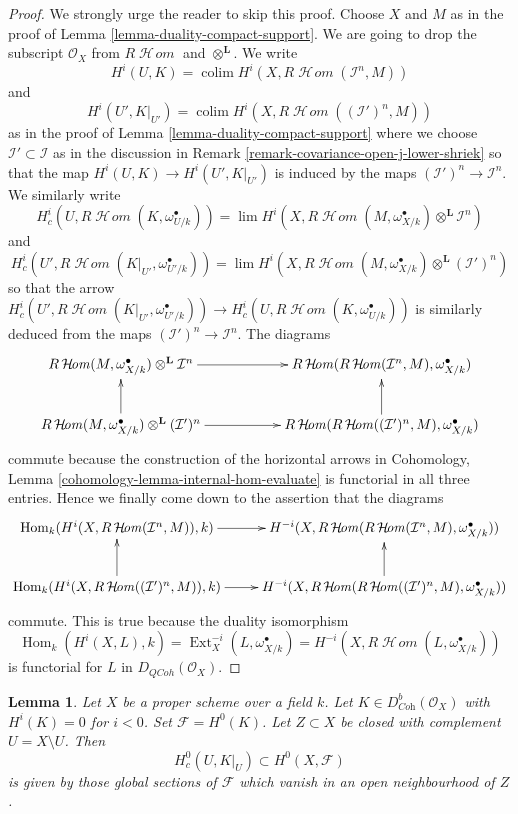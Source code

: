 \documentclass{stacks-project}
\theoremstyle{plain}
\newtheorem{lemma}[subsection]{Lemma}
\theoremstyle{definition}
\theoremstyle{remark}
\numberwithin{equation}{subsection}
\def\lim{\mathop{\mathrm{lim}}\nolimits}
\def\colim{\mathop{\mathrm{colim}}\nolimits}
\def\Hom{\mathop{\mathrm{Hom}}\nolimits}
\def\Ext{\mathop{\mathrm{Ext}}\nolimits}
\def\SheafHom{\mathop{\mathcal{H}\!\mathit{om}}\nolimits}
\def\QCoh{\mathit{QCoh}}
\begin{document}
\begin{proof}
We strongly urge the reader to skip this proof. Choose $X$ and $M$ as
in the proof of Lemma \ref{lemma-duality-compact-support}. We are going to drop
the subscript $\mathcal{O}_X$ from $R\SheafHom$ and $\otimes^\mathbf{L}$.
We write
$$
H^i(U, K) = \colim H^i(X, R\SheafHom(\mathcal{I}^n, M))
$$
and
$$
H^i(U', K|_{U'}) = \colim H^i(X, R\SheafHom((\mathcal{I}')^n, M))
$$
as in the proof of Lemma \ref{lemma-duality-compact-support} where we choose
$\mathcal{I}' \subset \mathcal{I}$ as in the discussion in
Remark \ref{remark-covariance-open-j-lower-shriek} so that the map
$H^i(U, K) \to H^i(U', K|_{U'})$ is induced by the maps
$(\mathcal{I}')^n \to \mathcal{I}^n$.
We similarly write
$$
H^i_c(U, R\SheafHom(K, \omega_{U/k}^\bullet)) =
\lim H^i(X,  R\SheafHom(M, \omega_{X/k}^\bullet)
\otimes^\mathbf{L} \mathcal{I}^n)
$$
and
$$
H^i_c(U', R\SheafHom(K|_{U'}, \omega_{U'/k}^\bullet)) =
\lim H^i(X,  R\SheafHom(M, \omega_{X/k}^\bullet)
\otimes^\mathbf{L} (\mathcal{I}')^n)
$$
so that the arrow $H^i_c(U', R\SheafHom(K|_{U'}, \omega_{U'/k}^\bullet))
\to H^i_c(U, R\SheafHom(K, \omega_{U/k}^\bullet))$ is similarly
deduced from the maps $(\mathcal{I}')^n \to \mathcal{I}^n$.
The diagrams
$$
\xymatrix{
R\SheafHom(M, \omega_{X/k}^\bullet)
\otimes^\mathbf{L} \mathcal{I}^n
\ar[rr] & &
R\SheafHom(R\SheafHom(\mathcal{I}^n, M), \omega_{X/k}^\bullet) \\
R\SheafHom(M, \omega_{X/k}^\bullet) \otimes^\mathbf{L} (\mathcal{I}')^n
\ar[rr] \ar[u] & &
R\SheafHom(R\SheafHom((\mathcal{I}')^n, M), \omega_{X/k}^\bullet) \ar[u]
}
$$
commute because the construction of the horizontal arrows in
Cohomology, Lemma \ref{cohomology-lemma-internal-hom-evaluate}
is functorial in all three entries. Hence we finally come down
to the assertion that the diagrams
$$
\xymatrix{
\Hom_k(H^i(X, R\SheafHom(\mathcal{I}^n, M)), k) \ar[r] &
H^{-i}(X, R\SheafHom(R\SheafHom(
\mathcal{I}^n, M), \omega_{X/k}^\bullet)) \\
\Hom_k(H^i(X, R\SheafHom((\mathcal{I}')^n, M)), k) \ar[r] \ar[u] &
H^{-i}(X, R\SheafHom(R\SheafHom(
(\mathcal{I}')^n, M), \omega_{X/k}^\bullet)) \ar[u]
}
$$
commute. This is true because the duality isomorphism
$$
\Hom_k(H^i(X, L), k) = \Ext^{-i}_X(L, \omega_{X/k}^\bullet) =
H^{-i}(X, R\SheafHom(L, \omega_{X/k}^\bullet))
$$
is functorial for $L$ in $D_\QCoh(\mathcal{O}_X)$.
\end{proof}

\begin{lemma}
\label{lemma-h0-compactly-supported}
Let $X$ be a proper scheme over a field $k$. Let
$K \in D^b_{\textit{Coh}}(\mathcal{O}_X)$ with $H^i(K) = 0$
for $i < 0$. Set $\mathcal{F} = H^0(K)$.
Let $Z \subset X$ be closed with complement $U = X \setminus U$.
Then
$$
H^0_c(U, K|_U) \subset H^0(X, \mathcal{F})
$$
is given by those global sections of $\mathcal{F}$ which
vanish in an open neighbourhood of $Z$.
\end{lemma}
\end{document}
